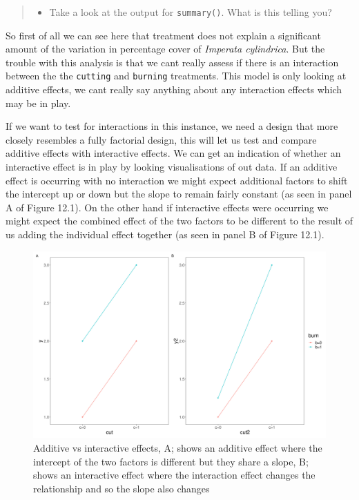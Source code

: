 \documentclass[
]{book}
\providecommand{\tightlist}{%
  \setlength{\itemsep}{0pt}\setlength{\parskip}{0pt}}
\begin{document}
\begin{quote}
\begin{itemize}
\tightlist
\item
  Take a look at the output for \texttt{summary()}. What is this telling you?
\end{itemize}
\end{quote}

So first of all we can see here that treatment does not explain a significant amount of the variation in percentage cover of \emph{Imperata cylindrica}. But the trouble with this analysis is that we cant really assess if there is an interaction between the the \texttt{cutting} and \texttt{burning} treatments. This model is only looking at additive effects, we cant really say anything about any interaction effects which may be in play.

If we want to test for interactions in this instance, we need a design that more closely resembles a fully factorial design, this will let us test and compare additive effects with interactive effects. We can get an indication of whether an interactive effect is in play by looking visualisations of out data. If an additive effect is occurring with no interaction we might expect additional factors to shift the intercept up or down but the slope to remain fairly constant (as seen in panel A of Figure 12.1). On the other hand if interactive effects were occurring we might expect the combined effect of the two factors to be different to the result of us adding the individual effect together (as seen in panel B of Figure 12.1).

\begin{figure}
\includegraphics[width=0.9\linewidth]{figures/additive_vs_interactive} \caption{Additive vs interactive effects, A; shows an additive effect where the intercept of the two factors is different but they share a slope, B; shows an interactive effect where the interaction effect changes the relationship and so the slope also changes}\label{fig:unnamed-chunk-100}
\end{figure}
\end{document}
